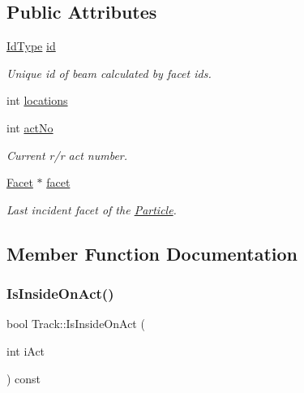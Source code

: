 \subsection*{Public Attributes}
\begin{DoxyCompactItemize}
\item 
\mbox{\label{class_track_a04d6f364003aa9e8cd212df0dbb2447f}} 
\mbox{\hyperlink{class_big_integer}{Id\+Type}} \mbox{\hyperlink{class_track_a04d6f364003aa9e8cd212df0dbb2447f}{id}}
\begin{DoxyCompactList}\small\item\em Unique id of beam calculated by facet ids. \end{DoxyCompactList}\item 
int \mbox{\hyperlink{class_track_a9a1bcdb52e5765ac6d91e62f26a51df0}{locations}}
\item 
\mbox{\label{class_track_a677ef64963f95925017853f2657722c7}} 
int \mbox{\hyperlink{class_track_a677ef64963f95925017853f2657722c7}{act\+No}}
\begin{DoxyCompactList}\small\item\em Current r/r act number. \end{DoxyCompactList}\item 
\mbox{\label{class_track_aa5529af7dae62559eb396deca64db430}} 
\mbox{\hyperlink{class_facet}{Facet}} $\ast$ \mbox{\hyperlink{class_track_aa5529af7dae62559eb396deca64db430}{facet}}
\begin{DoxyCompactList}\small\item\em Last incident facet of the \mbox{\hyperlink{class_particle}{Particle}}. \end{DoxyCompactList}\end{DoxyCompactItemize}


\subsection{Member Function Documentation}
\mbox{\label{class_track_afa8ecb5618ed9ecefab2ea5f0e755d44}} 
\subsubsection{\texorpdfstring{Is\+Inside\+On\+Act()}{IsInsideOnAct()}}
{\footnotesize\ttfamily bool Track\+::\+Is\+Inside\+On\+Act (\begin{DoxyParamCaption}\item[{int}]{i\+Act }\end{DoxyParamCaption}) const\hspace{0.3cm}{\ttfamily [inline]}}



